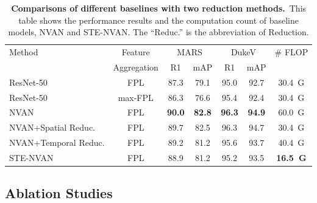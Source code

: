 \documentclass{bmvc2k}
\newcommand{\mycaption}[2]{\caption{\textbf{#1.}~#2}}
\begin{document}
\vspace{-3mm}
\begin{table}[t]
    \centering
    \mycaption{Comparisons of different baselines with two reduction methods}{This table shows the performance results and the computation count of baseline models, NVAN and STE-NVAN. The ``Reduc.'' is the abbreviation of Reduction.}
    \label{tab:ablation1}
    \begin{tabular}{l|c|cc|cc|c}
    \hline
    \multirow{2}{*}{Method} & Feature &\multicolumn{2}{c|}{MARS} & \multicolumn{2}{c|}{DukeV}& \multirow{2}{*}{\# FLOP} \\ 
    \cline{3-6} 
      & Aggregation & R1         & mAP       & R1    & mAP    &     \\ 
     \hline \hline
     ResNet-50   & FPL & 87.3       & 79.1      & 95.0  & 92.7   &  30.4~G \\
    ResNet-50   & max-FPL  & 86.3 & 76.6      & 95.4  & 92.4 & 30.4~G\\
    \hline
    NVAN   & FPL & \textbf{90.0}       & \textbf{82.8}      & \textbf{96.3}  & \textbf{94.9} & 60.0~G  \\
    NVAN+Spatial Reduc.   & FPL & 89.7      & 82.5      & 96.3  & 94.7    & 30.4~G \\
    NVAN+Temporal Reduc.   & FPL & 89.2       & 81.2      & 95.6  & 93.7    & 40.4~G \\
    \hline
    STE-NVAN   & FPL & 88.9      &   81.2    & 95.2  & 93.5   & \textbf{16.5~G} \\
    \hline
    \end{tabular}
    \vspace{-1mm}
\end{table}

\subsection{Ablation Studies}
\end{document}
